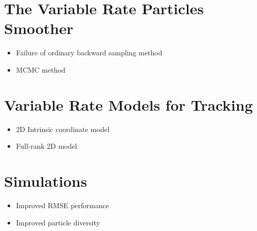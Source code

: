 \documentclass[journal]{IEEEtran}
\begin{document}
\section{The Variable Rate Particles Smoother}

\begin{itemize}
	\item Failure of ordinary backward sampling method
	\item MCMC method
\end{itemize}



\section{Variable Rate Models for Tracking}

\begin{itemize}
	\item 2D Intrinsic coordinate model
	\item Full-rank 2D model
\end{itemize}



\section{Simulations}

\begin{itemize}
	\item Improved RMSE performance
	\item Improved particle diversity
\end{itemize}






%
%
\end{document}
